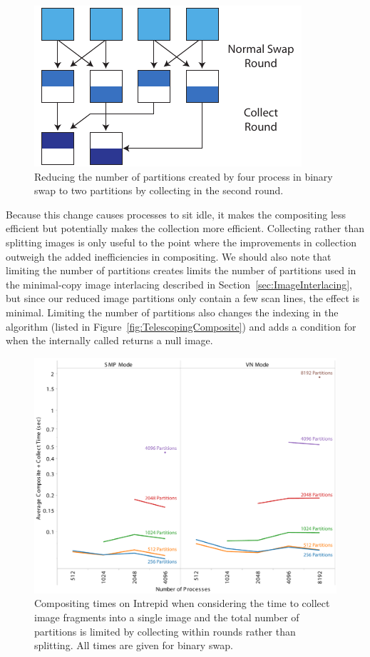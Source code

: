 \documentclass{sig-alternate}
\begin{document}
\begin{figure}[htbp]
  \centering
  \includegraphics{images/CollectRounds}
  \caption{Reducing the number of partitions created by four process in
    binary swap to two partitions by collecting in the second round.}
  \label{fig:CollectRounds}
\end{figure}

Because this change causes processes to sit idle, it makes the compositing
less efficient but potentially makes the collection more efficient.
Collecting rather than splitting images is only useful to the point where
the improvements in collection outweigh the added inefficiencies in
compositing.  We should also note that limiting the number of partitions
creates limits the number of partitions used in the minimal-copy image
interlacing described in Section~\ref{sec:ImageInterlacing}, but since our
reduced image partitions only contain a few scan lines, the effect is
minimal.  Limiting the number of partitions also changes the indexing in
the  algorithm (listed in
Figure~\ref{fig:TelescopingComposite}) and adds a condition for when the
internally called  returns a null image.

\begin{figure}[htbp]
  \centering
  \includegraphics[width=\linewidth]{images/PartitionCollectIntrepidReduced}
  \caption{Compositing times on Intrepid when considering the time to
    collect image fragments into a single image and the total number of
    partitions is limited by collecting within rounds rather than
    splitting.  All times are given for binary swap.}
  \label{fig:PartitionCollectReduced}
\end{figure}
\end{document}
